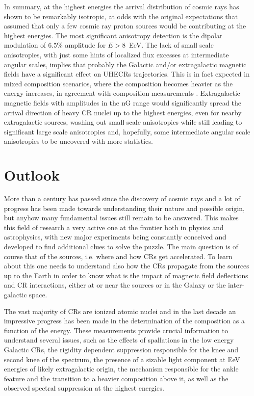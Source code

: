\documentclass[twoside,12pt]{article}
\begin{document}
In summary, at the highest energies the arrival distribution of cosmic rays has shown to be remarkably isotropic, at odds with the original expectations that assumed that only a few cosmic ray proton sources would be contributing at the highest energies. 
The most significant anisotropy detection is the dipolar modulation of $6.5\%$ amplitude for $E > 8$~EeV. The lack of small scale anisotropies, with just some hints of localized flux excesses at intermediate angular scales, implies that probably the Galactic and/or extragalactic magnetic fields have a significant effect on UHECRs trajectories. This is in fact expected in mixed composition scenarios, where the composition becomes heavier as the energy increases, in agreement with composition measurements \cite{augerxmax,sein}. Extragalactic magnetic fields with amplitudes in the nG range would significantly spread the arrival direction of heavy CR nuclei up to the highest energies, even for nearby extragalactic sources, washing out small scale anisotropies while still leading to significant large scale anisotropies and, hopefully, some intermediate angular scale anisotropies to be uncovered with more statistics.

\section{Outlook}

More than a century has passed since the discovery of cosmic rays and a lot of progress has been made towards understanding their nature and possible origin, but anyhow many fundamental issues still remain to be answered. This makes this field of research a very active one at the frontier both in physics and astrophysics, with new major experiments being constantly conceived and developed to find additional clues to solve the puzzle. The main question is of course that of the sources, i.e. where and how CRs get accelerated. To learn about this one needs to understand also how the CRs propagate from the sources up to the Earth in order to know what is the impact of magnetic field deflections and CR interactions, either at or near the sources or in the Galaxy or the inter-galactic space.



The vast majority of CRs are ionized atomic nuclei and in the last decade an impressive progress has been made in the determination of the composition as a function of the energy. These measurements provide crucial information to understand several issues, such as the effects of spallations in the low energy Galactic CRs, the rigidity dependent suppression responsible for the knee and second knee of the spectrum, the presence of a sizable light component at EeV energies of likely extragalactic origin, the mechanism responsible for the ankle feature and the transition to a heavier composition above it, as well as the observed spectral suppression at the highest energies.
\end{document}
